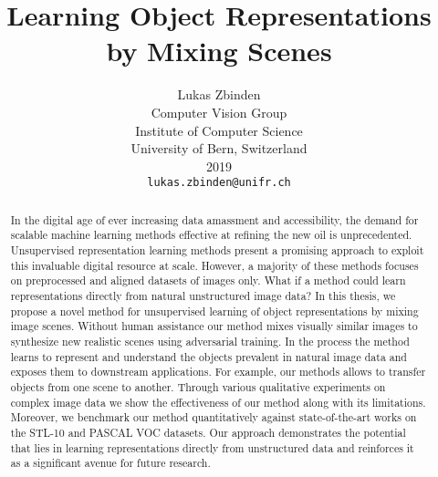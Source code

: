 \documentclass[12pt,a4paper]{article}
\begin{document}
\title{Learning Object Representations by Mixing Scenes}

\author{Lukas Zbinden\\
Computer Vision Group\\
Institute of Computer Science\\ 
University of Bern, Switzerland\\ 
2019\\
{\tt\small lukas.zbinden@unifr.ch}
}

\maketitle

\begin{abstract}

In the digital age of ever increasing data amassment and accessibility, the demand for scalable machine learning methods effective at refining the new oil is unprecedented. Unsupervised representation learning methods present a promising approach to exploit this invaluable digital resource at scale. However, a majority of these methods focuses on preprocessed and aligned datasets of images only. What if a method could learn representations directly from natural unstructured image data? In this thesis, we propose a novel method for unsupervised learning of object representations by mixing image scenes. Without human assistance our method mixes visually similar images to synthesize new realistic scenes using adversarial training. In the process the method learns to represent and understand the objects prevalent in natural image data and exposes them to downstream applications. For example, our methods allows to transfer objects from one scene to another. Through various qualitative experiments on complex image data we show the effectiveness of our method along with its limitations. Moreover, we benchmark our method quantitatively against state-of-the-art works on the STL-10 and PASCAL VOC datasets. Our approach demonstrates the potential that lies in learning representations directly from unstructured data and reinforces it as a significant avenue for future research.

\end{abstract}
\end{document}

